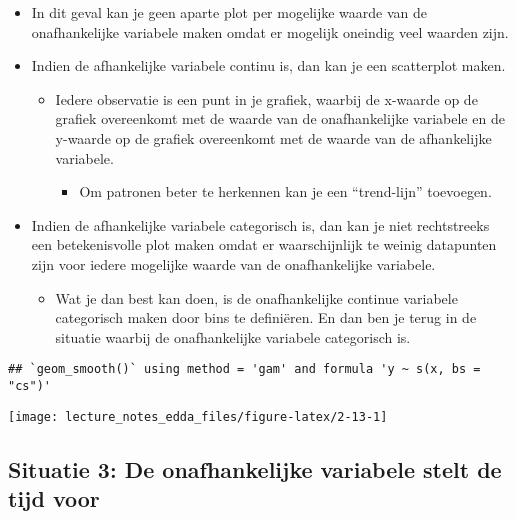 \documentclass[]{memoir}
\providecommand{\tightlist}{%
  \setlength{\itemsep}{0pt}\setlength{\parskip}{0pt}}
\begin{document}
\begin{itemize}
\tightlist
\item
  In dit geval kan je geen aparte plot per mogelijke waarde van de onafhankelijke variabele maken omdat er mogelijk oneindig veel waarden zijn.
\item
  Indien de afhankelijke variabele continu is, dan kan je een scatterplot maken.

  \begin{itemize}
  \tightlist
  \item
    Iedere observatie is een punt in je grafiek, waarbij de x-waarde op de grafiek overeenkomt met de waarde van de onafhankelijke variabele en de y-waarde op de grafiek overeenkomt met de waarde van de afhankelijke variabele.

    \begin{itemize}
    \tightlist
    \item
      Om patronen beter te herkennen kan je een ``trend-lijn'' toevoegen.
    \end{itemize}
  \end{itemize}
\item
  Indien de afhankelijke variabele categorisch is, dan kan je niet rechtstreeks een betekenisvolle plot maken omdat er waarschijnlijk te weinig datapunten zijn voor iedere mogelijke waarde van de onafhankelijke variabele.

  \begin{itemize}
  \tightlist
  \item
    Wat je dan best kan doen, is de onafhankelijke continue variabele categorisch maken door bins te definiëren. En dan ben je terug in de situatie waarbij de onafhankelijke variabele categorisch is.
  \end{itemize}
\end{itemize}

\begin{verbatim}
## `geom_smooth()` using method = 'gam' and formula 'y ~ s(x, bs = "cs")'
\end{verbatim}

\texttt{[image: lecture\_notes\_edda\_files/figure-latex/2-13-1]}

\hypertarget{situatie-3-de-onafhankelijke-variabele-stelt-de-tijd-voor}{%
\subsection{Situatie 3: De onafhankelijke variabele stelt de tijd voor}\label{situatie-3-de-onafhankelijke-variabele-stelt-de-tijd-voor}}
\end{document}
